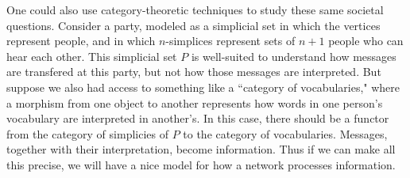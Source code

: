 \documentclass{amsart}
\begin{document}
One could also use category-theoretic techniques to study these same societal questions.  Consider a party, modeled as a simplicial set in which the vertices represent people, and in which $n$-simplices represent sets of $n+1$ people who can hear each other.  This simplicial set $P$ is well-suited to understand how messages are transfered at this party, but not how those messages are interpreted.  But suppose we also had access to something like a ``category of vocabularies," where a morphism from one object to another represents how words in one person's vocabulary are interpreted in another's.  In this case, there should be a functor from the category of simplicies of $P$ to the category of vocabularies.  Messages, together with their interpretation, become information.  Thus if we can make all this precise, we will have a nice model for how a network processes information.



\end{document}
